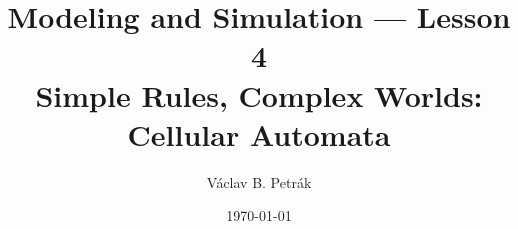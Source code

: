 \documentclass[11pt]{beamer}
\title{
Modeling and Simulation --- Lesson 4\\
\textbf{Simple Rules, Complex Worlds: 
Cellular Automata}}
\author{Václav B. Petrák}
\institute{Faculty of Biomedical Engineering\\
Czech Technical University}
\date{\today}
\begin{document}
\begin{frame}
\titlepage
\end{frame}
%



\end{document}
